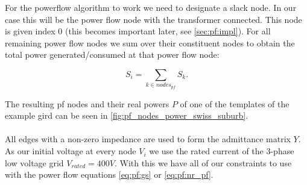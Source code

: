 For the powerflow algorithm to work we need to designate a slack node. In our
case this will be the power flow node with the transformer connected.
This node is given
index 0 (this becomes important later, see \autoref{sec:pf:impl}). For all
remaining power flow nodes we sum over their constituent nodes to
obtain the total power generated/consumed at that power flow node:

\begin{equation}
    S_i = \sum_{k \in nodes_{pf}} S_k.
\end{equation}

The resulting pf nodes and their real powers $P$ of one of the
templates of the example gird can be
seen in \autoref{fig:pf_nodes_power_swiss_suburb}.\\
\\
All edges with a non-zero impedance are used to form
the admittance matrix $Y$.
As our initial voltage at every node $V_i$ we use the rated
current of the 3-phase low voltage grid $V_{rated} = 400V$.
With this we have all of our constraints to use with
the power flow equations \autoref{eq:pf:gs} or \autoref{eq:pf:nr_pf}.


